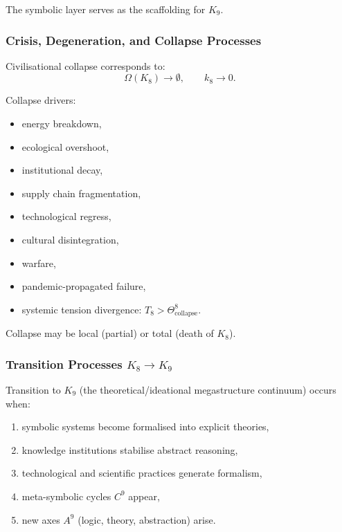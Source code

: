 The symbolic layer serves as the scaffolding for $K_9$.

\subsubsection{Crisis, Degeneration, and Collapse Processes}

Civilisational collapse corresponds to:
\[
\Omega(K_8) \to \emptyset,
\qquad 
k_8 \to 0.
\]

Collapse drivers:
\begin{itemize}
    \item energy breakdown,
    \item ecological overshoot,
    \item institutional decay,
    \item supply chain fragmentation,
    \item technological regress,
    \item cultural disintegration,
    \item warfare,
    \item pandemic-propagated failure,
    \item systemic tension divergence: $T_8 > \Theta^8_{\text{collapse}}$.
\end{itemize}

Collapse may be local (partial) or total (death of $K_8$).

\subsubsection{Transition Processes \texorpdfstring{$K_8 \to K_9$}{K_8 \to K_9}}

Transition to $K_9$ (the theoretical/ideational megastructure continuum) 
occurs when:

\begin{enumerate}
    \item symbolic systems become formalised into explicit theories,
    \item knowledge institutions stabilise abstract reasoning,
    \item technological and scientific practices generate formalism,
    \item meta-symbolic cycles $C^9$ appear,
    \item new axes $A^9$ (logic, theory, abstraction) arise.
\end{enumerate}

